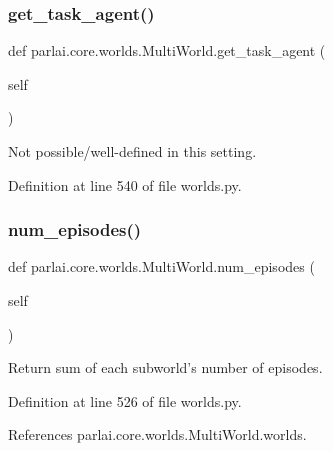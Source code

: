 \subsubsection{\texorpdfstring{get\+\_\+task\+\_\+agent()}{get\_task\_agent()}}
{\footnotesize\ttfamily def parlai.\+core.\+worlds.\+Multi\+World.\+get\+\_\+task\+\_\+agent (\begin{DoxyParamCaption}\item[{}]{self }\end{DoxyParamCaption})}

\begin{DoxyVerb}Not possible/well-defined in this setting.\end{DoxyVerb}
 

Definition at line 540 of file worlds.\+py.

\mbox{\label{classparlai_1_1core_1_1worlds_1_1MultiWorld_a3efde7408bd94052b0a4880aefbc5d0a}} 
\subsubsection{\texorpdfstring{num\+\_\+episodes()}{num\_episodes()}}
{\footnotesize\ttfamily def parlai.\+core.\+worlds.\+Multi\+World.\+num\+\_\+episodes (\begin{DoxyParamCaption}\item[{}]{self }\end{DoxyParamCaption})}

\begin{DoxyVerb}Return sum of each subworld's number of episodes.\end{DoxyVerb}
 

Definition at line 526 of file worlds.\+py.



References parlai.\+core.\+worlds.\+Multi\+World.\+worlds.



